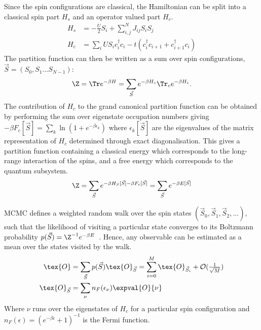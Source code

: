 Since the spin configurations are classical, the Hamiltonian can be split into a classical spin part \(H_s\) and an operator valued part \(H_c\).
\begin{align}
H_s& = - \frac{U}{2}S_i + \sum_{i, j}^{N} J_{ij} S_i S_j \\
H_c& = \sum_i U S_i c^\dag_{i}c_{i} -t(c^\dag_{i}c_{i+1} + c^\dag_{i+1}c_{i}) 
\end{align}
The partition function can then be written as a sum over spin configurations, \(\vec{S} = (S_0, S_1...S_{N-1})\):
\begin{align}
\Z = \Tr e^{-\beta H}= \sum_{\vec{S}} e^{-\beta H_s} \Tr_c e^{-\beta H_c} .
\end{align}
The contribution of \(H_c\) to the grand canonical partition function can be obtained by performing the sum over eigenstate occupation numbers giving \(-\beta F_c[\vec{S}] = \sum_k \ln{(1 + e^{- \beta \epsilon_k})}\) where \({\epsilon_k[\vec{S}]}\) are the eigenvalues of the matrix representation of \(H_c\) determined through exact diagonalisation. This gives a partition function containing a classical energy which corresponds to the long-range interaction of the spins, and a free energy which corresponds to the quantum subsystem. 
\begin{align}
\Z = \sum_{\vec{S}} e^{-\beta H_S[\vec{S}] - \beta F_c[\vec{S}]} = \sum_{\vec{S}} e^{-\beta E[\vec{S}]}
\end{align}

\ac{MCMC} defines a weighted random walk over the spin states \((\vec{S}_0, \vec{S}_1, \vec{S}_2, ...)\), such that the likelihood of visiting a particular state converges to its Boltzmann probability \(p(\vec{S}) = \Z^{-1} e^{-\beta E}\)~\cite{binderGuidePracticalWork1988,kerteszAdvancesComputerSimulation1998,wolffMonteCarloErrors2004}. Hence, any observable can be estimated as a mean over the states visited by the walk.
\begin{align} \label{eq:thermal_expectation}
\tex{O}& = \sum_{\vec{S}} p(\vec{S}) \tex{O}_{\vec{S}} = \sum_{i = 0}^{M} \tex{O}_{\vec{S}_i} + \mathcal{O}(\tfrac{1}{\sqrt{M}})\\
\tex{O}_{\vec{S}}& = \sum_{\nu} n_F(\epsilon_{\nu}) \expval{O}{\nu}
\end{align}
Where \(\nu\) runs over the eigenstates of \(H_c\) for a particular spin configuration and \(n_F(\epsilon) = \left(e^{-\beta\epsilon} + 1\right)^{-1}\) is the Fermi function.

